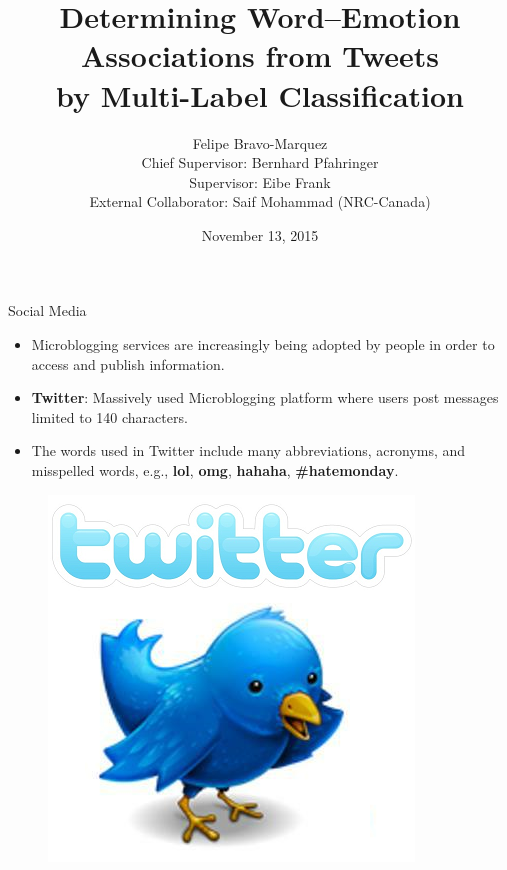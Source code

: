 \documentclass[handout]{beamer}
\title{Determining Word--Emotion Associations from Tweets\\ by Multi-Label Classification}
\author[Felipe Bravo Márquez]{\footnotesize
 \textcolor[rgb]{0.00,0.00,1.00}{Felipe Bravo-Marquez} \\ Chief Supervisor: Bernhard Pfahringer \\  Supervisor: Eibe Frank\\ External Collaborator: Saif Mohammad (NRC-Canada)}
\institute{University of Waikato \\ Computer Science Department }
\date{November 13, 2015}
\begin{document}
\begin{frame}
\titlepage


\end{frame}



\begin{frame}{Social Media}
\begin{scriptsize}
\begin{itemize}
 \item Microblogging services are increasingly being adopted by people in order to access and publish information.  
 \item \textbf{Twitter}: Massively used Microblogging platform where users post messages limited to 140 characters. 
 \item The words used in Twitter include many abbreviations, acronyms, and misspelled words, e.g., \textbf{lol}, \textbf{omg}, \textbf{hahaha}, \textbf{\#hatemonday}.
\end{itemize}
  \begin{figure}[h]
        	\includegraphics[scale = 0.2]{pics/twitter.png}
        \end{figure}

\end{scriptsize}
\end{frame}
\end{document}
